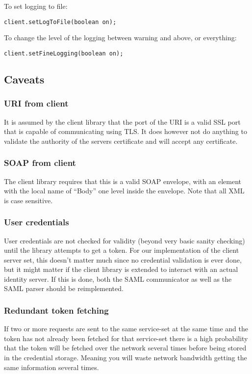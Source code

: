     To set logging to file:
    
\begin{lstlisting}[caption={Turn logging to file on or off}, label=userguideTogglelogtofile]
    client.setLogToFile(boolean on);
\end{lstlisting}

    To change the level of the logging between warning and above, or everything:

\begin{lstlisting}[caption={Switch between the two logging scopes}, label=userguideToggleloggingdetails]
    client.setFineLogging(boolean on);
\end{lstlisting}

\subsection{Caveats}\label{userguideCaveats}
\subsubsection{URI from client}
It is assumed by the client library that the port of the URI is a valid SSL port that is capable of communicating using TLS. It does however not do anything to validate the authority of the servers certificate and will accept any certificate.

\subsubsection{SOAP from client}
The client library requires that this is a valid SOAP envelope, with an element with the local name of “Body” one level inside the envelope. Note that all XML is case sensitive.

\subsubsection{User credentials}
User credentials are not checked for validity (beyond very basic sanity checking) until the library attempts to get a token.
For our implementation of the client server set, this doesn't matter much since no credential validation is ever done, but it might matter if the client library is extended to interact with an actual identity server. If this is done, both the SAML communicator as well as the SAML parser should be reimplemented.

\subsubsection{Redundant token fetching}
If two or more requests are sent to the same service-set at the same time and the token has not already been fetched for that service-set there is a high probability that the token will be fetched over the network several times before being stored in the credential storage. Meaning you will waste network bandwidth getting the same information several times.

